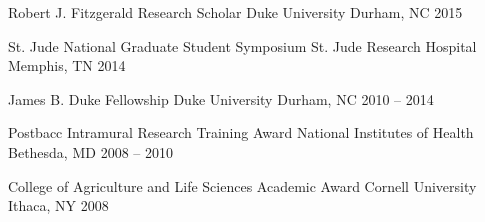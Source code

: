 

\begin{cvhonors}


  \cvhonor
    {Robert J. Fitzgerald Research Scholar} %
    {Duke University} %
    {Durham, NC} %
    {2015} %


  \cvhonor
    {St. Jude National Graduate Student Symposium} %
    {St. Jude Research Hospital} %
    {Memphis, TN} %
    {2014} %


  \cvhonor
    {James B. Duke Fellowship} %
    {Duke University} %
    {Durham, NC} %
    {2010 -- 2014} %


  \cvhonor
    {Postbacc Intramural Research Training Award} %
    {National Institutes of Health} %
    {Bethesda, MD} %
    {2008 -- 2010} %

  \cvhonor
    {College of Agriculture and Life Sciences Academic Award}
    {Cornell University} %
    {Ithaca, NY} %
    {2008} %



\end{cvhonors}
\vspace{-2mm}
